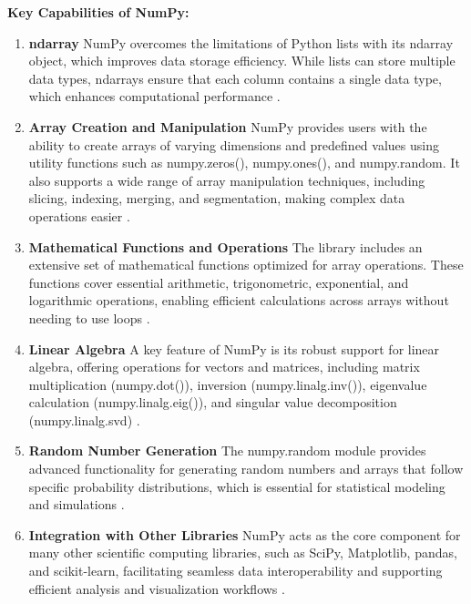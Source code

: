 \textbf{Key Capabilities of NumPy:}

\begin{enumerate}
	\item \textbf{ndarray}  
	NumPy overcomes the limitations of Python lists with its ndarray object, which improves data storage efficiency. While lists can store multiple data types, ndarrays ensure that each column contains a single data type, which enhances computational performance \cite{NumPy:2024}.
	
	\item \textbf{Array Creation and Manipulation}  
	NumPy provides users with the ability to create arrays of varying dimensions and predefined values using utility functions such as numpy.zeros(), numpy.ones(), and numpy.random. It also supports a wide range of array manipulation techniques, including slicing, indexing, merging, and segmentation, making complex data operations easier \cite{GeeksforGeeks:2017}.
	
	\item \textbf{Mathematical Functions and Operations}  
	The library includes an extensive set of mathematical functions optimized for array operations. These functions cover essential arithmetic, trigonometric, exponential, and logarithmic operations, enabling efficient calculations across arrays without needing to use loops \cite{GeeksforGeeks:2017}.
	
	\item \textbf{Linear Algebra}  
	A key feature of NumPy is its robust support for linear algebra, offering operations for vectors and matrices, including matrix multiplication (numpy.dot()), inversion (numpy.linalg.inv()), eigenvalue calculation (numpy.linalg.eig()), and singular value decomposition (numpy.linalg.svd) \cite{GeeksforGeeks:2017}.
	
	\item \textbf{Random Number Generation}  
	The numpy.random module provides advanced functionality for generating random numbers and arrays that follow specific probability distributions, which is essential for statistical modeling and simulations \cite{GeeksforGeeks:2017}.
	
	\item \textbf{Integration with Other Libraries}  
	NumPy acts as the core component for many other scientific computing libraries, such as SciPy, Matplotlib, pandas, and scikit-learn, facilitating seamless data interoperability and supporting efficient analysis and visualization workflows \cite{Raj:2019}.
	
\end{enumerate}



